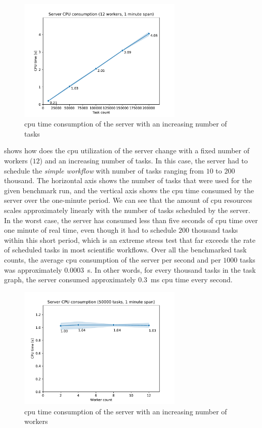 \begin{figure}[h]
	\centering
	\includegraphics[width=0.7\textwidth]{imgs/hq/charts/server-utilization-tasks}
	\caption{\gls{cpu} time consumption of the \hyperqueue{} server with an increasing
	number of tasks}
	\label{fig:hq-server-cpu-consumption-tasks}
\end{figure}

 shows how does the \gls{cpu} utilization of the
server change with a fixed number of workers ($12$) and an increasing number of
tasks. In this case, the server had to schedule the \emph{simple workflow} with number of tasks
ranging from $10$ to $200$ thousand. The horizontal axis shows
the number of tasks that were used for the given benchmark run, and the vertical axis shows the
\gls{cpu} time consumed by the server over the one-minute period. We can see that the
amount of \gls{cpu} resources scales approximately linearly with the number of tasks
scheduled by the server. In the worst case, the server has consumed less than five seconds of
\gls{cpu} time over one minute of real time, even though it had to schedule
$200$ thousand tasks within this short period, which is an extreme stress test
that far exceeds the rate of scheduled tasks in most scientific workflows. Over all the benchmarked
task counts, the average \gls{cpu} consumption of the server per second and per
$1000$ tasks was approximately $0.0003$~s. In other words, for
every thousand tasks in the task graph, the server consumed approximately
$0.3$~ms \gls{cpu} time every second.

\begin{figure}[h]
	\centering
	\includegraphics[width=0.7\textwidth]{imgs/hq/charts/server-utilization-workers}
	\caption{\gls{cpu} time consumption of the \hyperqueue{} server with an increasing
	number of workers}
	\label{fig:hq-server-cpu-consumption-workers}
\end{figure}

